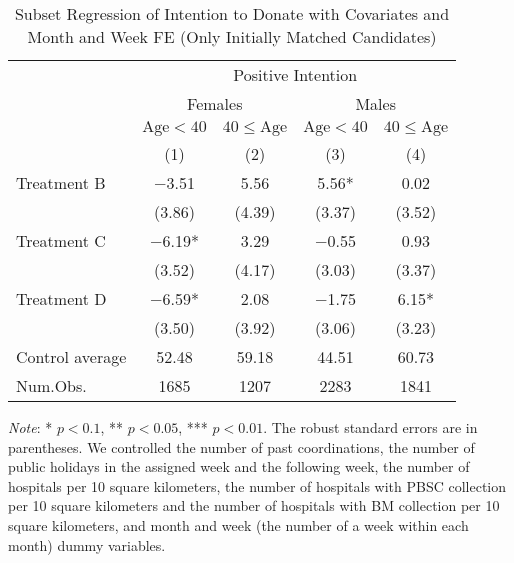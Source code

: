 \documentclass[12pt, a4paper]{article}
\begin{document}
\begin{table}[H]

\caption{\label{tab:lm-positive-subset2-init}Subset Regression of Intention to Donate with Covariates and Month and Week FE (Only Initially Matched Candidates)}
\centering
\fontsize{8}{10}\selectfont
\begin{threeparttable}
\begin{tabular}[t]{lcccc}
\toprule
\multicolumn{1}{c}{ } & \multicolumn{4}{c}{Positive Intention} \\
\cmidrule(l{3pt}r{3pt}){2-5}
\multicolumn{1}{c}{ } & \multicolumn{2}{c}{Females} & \multicolumn{2}{c}{Males} \\
\cmidrule(l{3pt}r{3pt}){2-3} \cmidrule(l{3pt}r{3pt}){4-5}
\multicolumn{1}{c}{ } & \multicolumn{1}{c}{$\text{Age} < 40$} & \multicolumn{1}{c}{$40 \le \text{Age}$} & \multicolumn{1}{c}{$\text{Age} < 40$} & \multicolumn{1}{c}{$40 \le \text{Age}$} \\
\cmidrule(l{3pt}r{3pt}){2-2} \cmidrule(l{3pt}r{3pt}){3-3} \cmidrule(l{3pt}r{3pt}){4-4} \cmidrule(l{3pt}r{3pt}){5-5}
  & (1) & (2) & (3) & (4)\\
\midrule
Treatment B & \num{-3.51} & \num{5.56} & \num{5.56}* & \num{0.02}\\
 & (\num{3.86}) & (\num{4.39}) & (\num{3.37}) & (\num{3.52})\\
Treatment C & \num{-6.19}* & \num{3.29} & \num{-0.55} & \num{0.93}\\
 & (\num{3.52}) & (\num{4.17}) & (\num{3.03}) & (\num{3.37})\\
Treatment D & \num{-6.59}* & \num{2.08} & \num{-1.75} & \num{6.15}*\\
 & (\num{3.50}) & (\num{3.92}) & (\num{3.06}) & (\num{3.23})\\
\midrule
Control average & 52.48 & 59.18 & 44.51 & 60.73\\
Num.Obs. & \num{1685} & \num{1207} & \num{2283} & \num{1841}\\
\bottomrule
\end{tabular}
\begin{tablenotes}
\item \emph{Note}: * $p < 0.1$, ** $p < 0.05$, *** $p < 0.01$. The robust standard errors are in parentheses. We controlled the number of past coordinations, the number of public holidays in the assigned week and the following week, the number of hospitals per 10 square kilometers, the number of hospitals with PBSC collection per 10 square kilometers and the number of hospitals with BM collection per 10 square kilometers, and month and week (the number of a week within each month) dummy variables.
\end{tablenotes}
\end{threeparttable}
\end{table}
\end{document}
